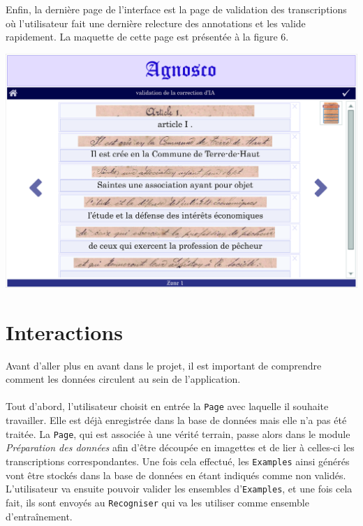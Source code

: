 Enfin, la dernière page de l'interface est la page de validation des transcriptions où l'utilisateur fait une dernière relecture des annotations et les valide rapidement. La maquette de cette page est présentée à la figure 6.

\begin{mdframed}[frametitle={Figure 6 : Maquette de la page de validation des annotations}, innerbottommargin=10]
\begin{center}
\includegraphics[scale=0.04]{assets/maquetteIHMvalidationIA.jpg}
\end{center}
\end{mdframed}

\section{Interactions}

Avant d'aller plus en avant dans le projet, il est important de comprendre comment les données circulent au sein de l'application. 

\paragraph{}
Tout d'abord, l'utilisateur choisit en entrée la \texttt{Page} avec laquelle il souhaite travailler. Elle est déjà enregistrée dans la base de données mais elle n'a pas été traitée. La \texttt{Page}, qui est associée à une vérité terrain, passe alors dans le module \textit{Préparation des données} afin d'être découpée en imagettes et de lier à celles-ci les transcriptions correspondantes. Une fois cela effectué, les \texttt{Examples} ainsi générés vont être stockés dans la base de données en étant indiqués comme non validés. L'utilisateur va ensuite pouvoir valider les ensembles d'\texttt{Examples}, et une fois cela fait, ils sont envoyés au \texttt{Recogniser} qui va les utiliser comme ensemble d'entraînement.

